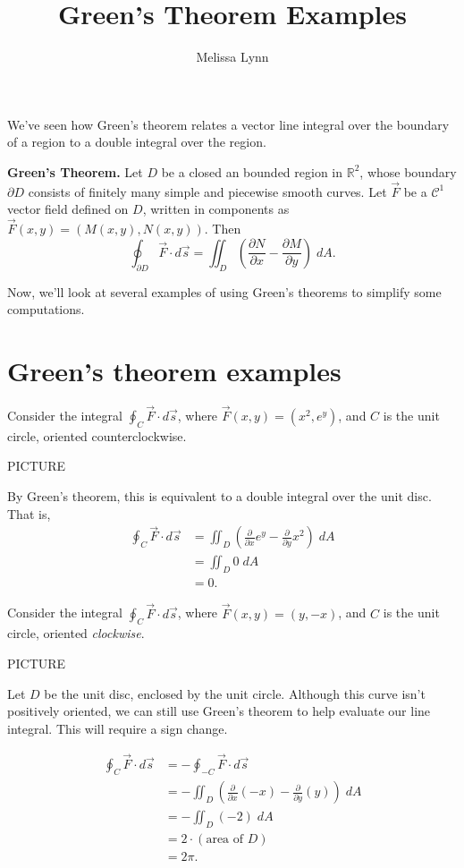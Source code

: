 \documentclass{ximera}
\title{Green's Theorem Examples}
\author{Melissa Lynn}
\begin{document}
  
\begin{abstract}  
\end{abstract}  
\maketitle  

We've seen how Green's theorem relates a vector line integral over the boundary of a region to a double integral over the region.

\begin{theorem}
\textbf{Green's Theorem.} Let $D$ be a closed an bounded region in $\mathbb{R}^2$, whose boundary $\partial D$ consists of finitely many simple and piecewise smooth curves. Let $\vec{F}$ be a $\mathcal{C}^1$ vector field defined on $D$, written in components as $\vec{F}(x,y) = (M(x,y), N(x,y))$. Then
\[
\oint_{\partial D}\vec{F}\cdot d\vec{s} = \iint_D \left(\frac{\partial N}{\partial x} - \frac{\partial M}{\partial y}\right)\;dA.
\]
\end{theorem}

Now, we'll look at several examples of using Green's theorems to simplify some computations.

\section*{Green's theorem examples}

\begin{example}
Consider the integral $\oint_C \vec{F}\cdot d\vec{s}$, where $\vec{F}(x,y) = (x^2, e^y)$, and $C$ is the unit circle, oriented counterclockwise.

PICTURE

By Green's theorem, this is equivalent to a double integral over the unit disc. That is,
\begin{align*}
\oint_C \vec{F}\cdot d\vec{s} &= \iint_D \left(\frac{\partial}{\partial x}e^y - \frac{\partial}{\partial y}x^2\right)\;dA\\
&= \iint_D 0\;dA\\
&= 0.
\end{align*}
\end{example}

\begin{example}
Consider the integral $\oint_C \vec{F}\cdot d\vec{s}$, where $\vec{F}(x,y) = (y, -x)$, and $C$ is the unit circle, oriented \emph{clockwise}.

PICTURE

Let $D$ be the unit disc, enclosed by the unit circle. Although this curve isn't positively oriented, we can still use Green's theorem to help evaluate our line integral. This will require a sign change.

\begin{align*}
\oint_C\vec{F}\cdot d\vec{s} &= - \oint_{-C}\vec{F}\cdot d\vec{s}\\
&= -\iint_D \left(\frac{\partial}{\partial x}(-x) - \frac{\partial}{\partial y}(y)\right)\;dA\\
&= -\iint_D \left(-2\right)\;dA\\
&= 2\cdot (\text{area of }D)\\
&= 2\pi.
\end{align*}
\end{example}
\end{document}
